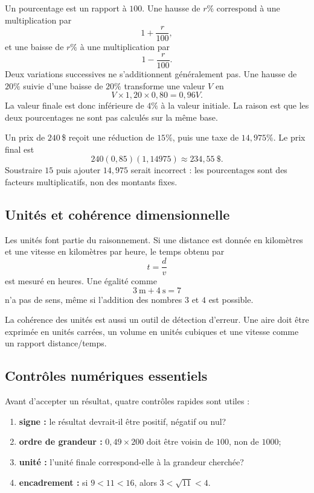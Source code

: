 \documentclass[12pt,a4paper,openany]{book}
\begin{document}
Un pourcentage est un rapport à $100$. Une hausse de $r\%$ correspond à une multiplication par
\[
1+\frac r{100},
\]
et une baisse de $r\%$ à une multiplication par
\[
1-\frac r{100}.
\]
Deux variations successives ne s'additionnent généralement pas. Une hausse de $20\%$ suivie d'une baisse de $20\%$ transforme une valeur $V$ en
\[
V\times1{,}20\times0{,}80=0{,}96V.
\]
La valeur finale est donc inférieure de $4\%$ à la valeur initiale. La raison est que les deux pourcentages ne sont pas calculés sur la même base.

\begin{examplebox}
Un prix de $240\,$\$ reçoit une réduction de $15\%$, puis une taxe de $14{,}975\%$. Le prix final est
\[
240(0{,}85)(1{,}14975)\approx234{,}55\ \$.
\]
Soustraire $15$ puis ajouter $14{,}975$ serait incorrect : les pourcentages sont des facteurs multiplicatifs, non des montants fixes.
\end{examplebox}

\subsection{Unités et cohérence dimensionnelle}

Les unités font partie du raisonnement. Si une distance est donnée en kilomètres et une vitesse en kilomètres par heure, le temps obtenu par
\[
t=\frac d v
\]
est mesuré en heures. Une égalité comme
\[
3\ \mathrm{m}+4\ \mathrm{s}=7
\]
n'a pas de sens, même si l'addition des nombres $3$ et $4$ est possible.

La cohérence des unités est aussi un outil de détection d'erreur. Une aire doit être exprimée en unités carrées, un volume en unités cubiques et une vitesse comme un rapport distance/temps.

\subsection{Contrôles numériques essentiels}

Avant d'accepter un résultat, quatre contrôles rapides sont utiles :
\begin{enumerate}
\item \textbf{signe :} le résultat devrait-il être positif, négatif ou nul?
\item \textbf{ordre de grandeur :} $0{,}49\times200$ doit être voisin de $100$, non de $1000$;
\item \textbf{unité :} l'unité finale correspond-elle à la grandeur cherchée?
\item \textbf{encadrement :} si $9<11<16$, alors $3<\sqrt{11}<4$.
\end{enumerate}
\end{document}
